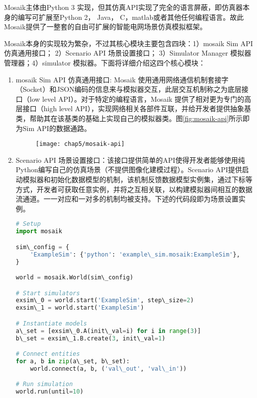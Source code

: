 Mosaik主体由Python 3 实现，但其仿真API实现了完全的语言屏蔽，即仿真器本身的编写可扩展至Python 2， Java， C，matlab或者其他任何编程语言。故此Mosaik提供了一整套的自由可扩展的智能电网场景仿真模拟框架。

Mosaik本身的实现较为繁杂，不过其核心模块主要包含四块：1）mosaik Sim API 仿真通用接口； 2）Scenario API 场景设置接口； 3）Simulator Manager 模拟器管理器；4）simulator 模拟器。下面将详细介绍这四个核心模块：

\begin{enumerate}
\item mosaik Sim API 仿真通用接口: Mosaik 使用通用网络通信机制套接字（Socket）和JSON编码的信息来与模拟器交互，此层交互机制称之为底层接口（low level API）。对于特定的编程语言，Mosaik 提供了相对更为专门的高层接口（high level API），实现网络相关各部件互联，并给开发者提供抽象基类，帮助其在该基类的基础上实现自己的模拟器类。图\ref{fig:mosaik-api}所示即为Sim API的数据通路。
    
\begin{figure}[!htp]
 \centering
 \texttt{[image: chap5/mosaik-api]}
\end{figure}

\item Scenario API 场景设置接口：该接口提供简单的API使得开发者能够使用纯Python编写自己的仿真场景（不提供图像化建模过程）。Scenario API提供启动模拟器和初始化数据模型的机制，该机制反馈数据模型实例集，通过下标等方式，开发者可获取任意实例，并将之互相关联，以构建模拟器间相互的数据流通道。一一对应和一对多的机制均被支持。下述的代码段即为场景设置实例。
    
\begin{lstlisting}[language={Python}, caption={场景设置实例}]   
# Setup
import mosaik

sim\_config = {
    'ExampleSim': {'python': 'example\_sim.mosaik:ExampleSim'},
}

world = mosaik.World(sim\_config)

# Start simulators
exsim\_0 = world.start('ExampleSim', step\_size=2)
exsim\_1 = world.start('ExampleSim')

# Instantiate models
a\_set = [exsim\_0.A(init\_val=i) for i in range(3)]
b\_set = exsim\_1.B.create(3, init\_val=1)

# Connect entities
for a, b in zip(a\_set, b\_set):
    world.connect(a, b, ('val\_out', 'val\_in'))

# Run simulation
world.run(until=10)


\end{lstlisting}
\end{enumerate}
